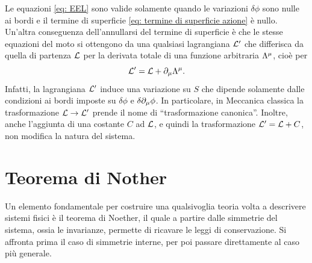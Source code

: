 Le equazioni \eqref{eq: EEL} sono valide solamente quando le variazioni $\delta\phi$ sono nulle ai bordi e il termine di superficie \eqref{eq: termine di superficie azione} è nullo. Un'altra conseguenza dell'annullarsi del termine di superficie è che le stesse equazioni del moto si ottengono da una qualsiasi lagrangiana $\mathcal{L}'$ che differisca da quella di partenza $\mathcal{L}$ per la derivata totale di una funzione arbitraria $\Lambda^\mu$, cioè per
\begin{equation}
    \mathcal{L}' = \mathcal{L} + \partial_\mu\Lambda^\mu.
\end{equation}
Infatti, la lagrangiana $\mathcal{L}'$ induce una variazione su $S$ che dipende solamente dalle condizioni ai bordi imposte su $\delta\phi$ e $\delta\partial_\mu\phi$. In particolare, in Meccanica classica la trasformazione $\mathcal{L}\to\mathcal{L}'$ prende il nome di ``trasformazione canonica''. Inoltre, anche l'aggiunta di una costante $C$ ad $\mathcal{L}$, e quindi la trasformazione $\mathcal{L}' = \mathcal{L} + C$, non modifica la natura del sistema.

\section{Teorema di Nother}
Un elemento fondamentale per costruire una qualsivoglia teoria volta a descrivere sistemi fisici è il teorema di Noether, il quale a partire dalle simmetrie del sistema, ossia le invarianze,  permette di ricavare le leggi di conservazione. Si affronta prima il caso di simmetrie interne, per poi passare direttamente al caso più generale.


